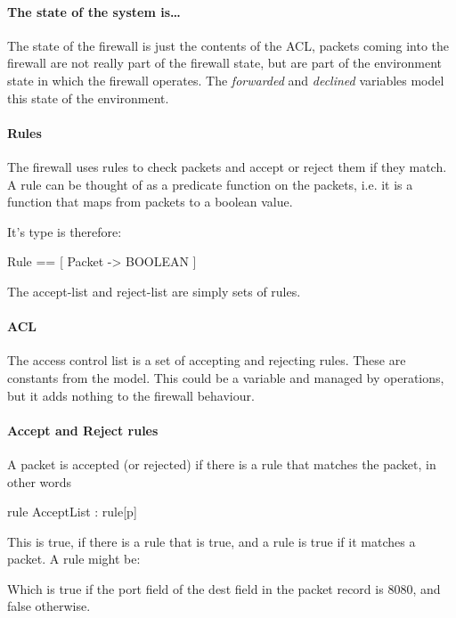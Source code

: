 \documentclass[12pt]{article}
\begin{document}
\paragraph{The state of the system is\ldots}
The state of the firewall is just the contents of the ACL, packets coming
into the firewall are not really part of the firewall state, but are part of
the environment state in which the firewall operates.
The \emph{forwarded} and \emph{declined} variables model this state of the
environment.

\paragraph{Rules}  The firewall uses rules to check packets and accept or
reject them if they match.  A rule can be thought of as a predicate function
on the packets, i.e. it is a function that maps from packets to a boolean
value.

It's type is therefore:
\begin{tla}
	Rule == [ Packet -> BOOLEAN ]
\end{tla}
\begin{tlatex}
%
\end{tlatex}

The accept-list and reject-list are simply sets of rules.

\paragraph{ACL} The access control list is a set of accepting and rejecting
rules.  These are constants from the model.  This could be a variable and
managed by operations, but it adds nothing to the firewall behaviour. 

\paragraph{Accept and Reject rules} A packet is accepted (or rejected) if
there is a rule that matches the packet, in other words
\begin{tla}
	\E rule \in AcceptList : rule[p]
\end{tla}
\begin{tlatex}
%
\end{tlatex}
This is true, if there is a rule that is true, and a rule is true if it
matches a packet.
A rule might be:
\begin{tla}
	[ p \in Packet |-> p.dest.port = 8080 ]
\end{tla}
\begin{tlatex}
%
\end{tlatex}
Which is true if the port field of the dest field in the packet record is
8080, and false otherwise.
\end{document}
